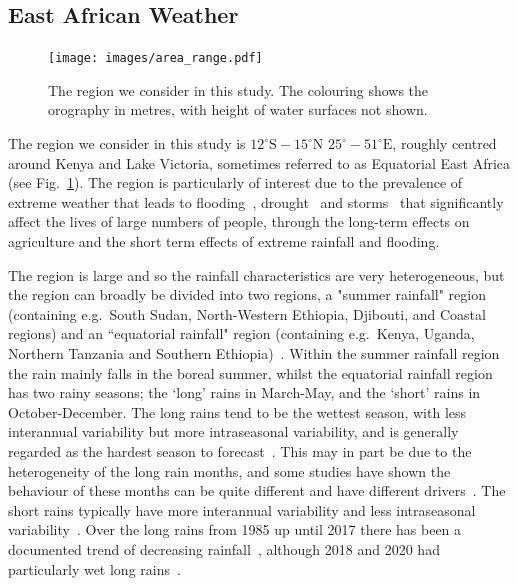 \documentclass{article}
\begin{document}
\subsection{East African Weather}


\begin{figure}[t]
    \centering
    \texttt{[image: images/area\_range.pdf]}
    
    \caption{The region we consider in this study. The colouring shows the orography in metres, with height of water surfaces not shown.}
    \label{fig:cgan_sample}
\end{figure}

The region we consider in this study is $12^{\circ}\text{S}-15^{\circ}\text{N}$   $25^{\circ}-51^{\circ}\text{E}$, roughly centred around Kenya and Lake Victoria, sometimes referred to as Equatorial East Africa (see Fig.~\ref{fig:cgan_sample}). The region is particularly of interest due to the prevalence of extreme weather that leads to flooding~\citep{kilavi_extreme_2018,wainwright_extreme_2021}, drought~\citep{gebremeskel_haile_droughts_2019} and storms~\citep{thiery_hazardous_2016, woodhams_identifying_2019} that significantly affect the lives of large numbers of people, through the long-term effects on agriculture and the short term effects of extreme rainfall and flooding. 


 
The region is large and so the rainfall characteristics are very heterogeneous, but the region can broadly be divided into two regions, a "summer rainfall" region (containing e.g.~South Sudan, North-Western Ethiopia, Djibouti, and Coastal regions) and an ``equatorial rainfall" region (containing e.g.~Kenya, Uganda, Northern Tanzania and Southern Ethiopia)~\citep{nicholson_climate_2017}. Within the summer rainfall region the rain mainly falls in the boreal summer, whilst the equatorial rainfall region has two rainy seasons; the `long' rains in March-May, and the `short' rains in October-December. The long rains tend to be the wettest season, with less interannual variability but more intraseasonal variability, and is generally regarded as the hardest season to forecast~\citep{nicholson_climate_2017, walker_skill_2019, kilavi_extreme_2018}. This may in part be due to the heterogeneity of the long rain months, and some studies have shown the behaviour of these months can be quite different and have different drivers~\citep{camberlin_east_2002}. The short rains typically have more interannual variability and less intraseasonal variability~\citep{black_observational_2003}. Over the long rains from 1985 up until 2017 there has been a documented trend of decreasing rainfall~\citep{wainwright_eastern_2019, liebmann_understanding_2014}, although 2018 and 2020 had particularly wet long rains~\citep{palmer_drivers_2023}.
\end{document}
